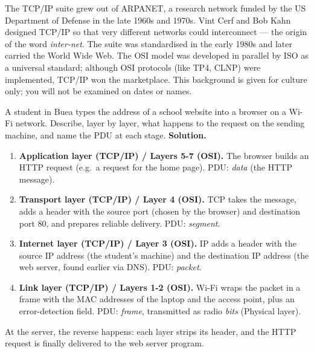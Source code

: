 \documentclass[11pt]{article}
\newcommand{\cle}[1]{{\popxbold\color{popdark}#1}}
\begin{document}
\begin{savaistu}
The TCP/IP suite grew out of \cle{ARPANET}, a research network funded by the US Department of Defense in the late 1960s and 1970s. Vint Cerf and Bob Kahn designed TCP/IP so that very different networks could interconnect --- the origin of the word \emph{inter-net}. The suite was standardised in the early 1980s and later carried the World Wide Web. The OSI model was developed in parallel by ISO as a universal standard; although OSI protocols (like TP4, CLNP) were implemented, TCP/IP won the marketplace. This background is given for culture only; you will not be examined on dates or names.
\end{savaistu}

\begin{exoresolu}
A student in Buea types the address of a school website into a browser on a Wi-Fi network. Describe, layer by layer, what happens to the request on the sending machine, and name the PDU at each stage.
\tcblower
\textbf{Solution.}
\begin{enumerate}
\item \textbf{Application layer (TCP/IP) / Layers 5-7 (OSI).} The browser builds an HTTP request (e.g.\ a request for the home page). PDU: \emph{data} (the HTTP message).
\item \textbf{Transport layer (TCP/IP) / Layer 4 (OSI).} TCP takes the message, adds a header with the source port (chosen by the browser) and destination port 80, and prepares reliable delivery. PDU: \emph{segment}.
\item \textbf{Internet layer (TCP/IP) / Layer 3 (OSI).} IP adds a header with the source IP address (the student's machine) and the destination IP address (the web server, found earlier via DNS). PDU: \emph{packet}.
\item \textbf{Link layer (TCP/IP) / Layers 1-2 (OSI).} Wi-Fi wraps the packet in a frame with the MAC addresses of the laptop and the access point, plus an error-detection field. PDU: \emph{frame}, transmitted as radio \emph{bits} (Physical layer).
\end{enumerate}
At the server, the reverse happens: each layer strips its header, and the HTTP request is finally delivered to the web server program.
\end{exoresolu}
\end{document}
